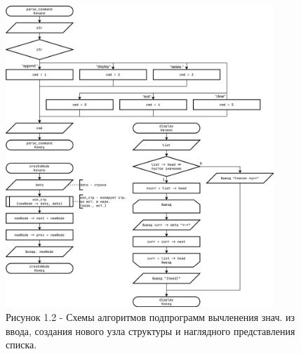 \documentclass[oneside,a4paper,14pt]{extarticle}
\begin{document}
\clearpage
\begin{figure}[H]
	\centering
	\includegraphics[width=0.9\textwidth]{pics/flowchart2.png}
	\caption*{Рисунок 1.2 - Схемы алгоритмов подпрограмм вычленения знач. из ввода, создания нового узла структуры и наглядного представления списка.}
\end{figure}
\end{document}
